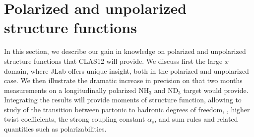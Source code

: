 \section{Polarized and unpolarized structure functions}

In this section, we describe our gain in knowledge on polarized and 
unpolarized structure functions that CLAS12 will provide. We discuss
first the large $x$ domain, where JLab offers unique insight, both in
the polarized and unpolarized case. We then illustrate the dramatic
increase in precision on that two months measurements on a longitudinally
polarized NH$_3$ and ND$_3$ target would provide. Integrating
the results will provide moments of structure function, allowing to
study of the transition between partonic to hadronic degrees of freedom,
, higher twist coefficients, the strong coupling constant $\alpha_s$, 
and sum rules and related quantities such as polarizabilities. 

